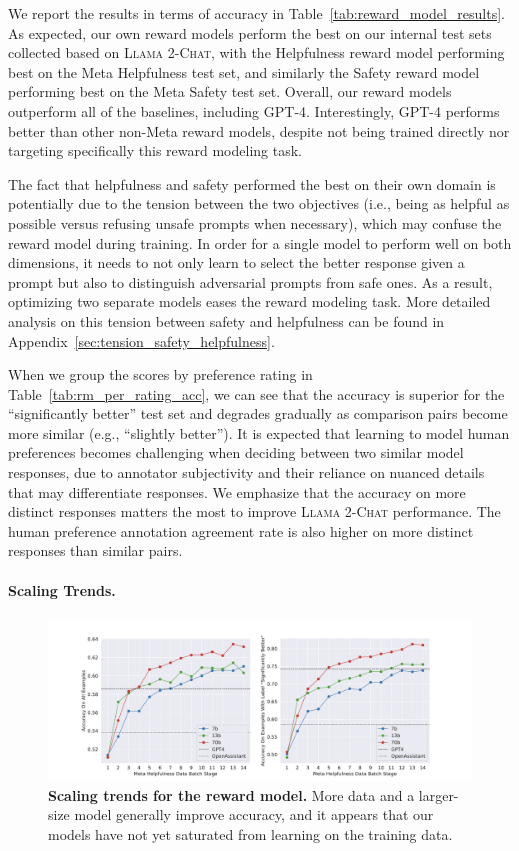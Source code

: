 \documentclass{article}
\newcommand{\modelname}{\textsc{Llama 2-Chat}\xspace}
\begin{document}
We report the results in terms of accuracy in Table~\ref{tab:reward_model_results}. 
As expected, our own reward models perform the best on our internal test sets collected based on \modelname, with the Helpfulness reward model performing best on the Meta Helpfulness test set, and similarly the Safety reward model performing best on the Meta Safety test set. Overall, our reward models outperform all of the baselines, including GPT-4. Interestingly, GPT-4 performs better than other non-Meta reward models, despite not being trained directly nor targeting specifically this reward modeling task. 

The fact that helpfulness and safety performed the best on their own domain is potentially due to the tension between the two objectives (i.e., being as helpful as possible versus refusing unsafe prompts when necessary), which may confuse the reward model during training. 
In order for a single model to perform well on both dimensions, it needs to not only learn to select the better response given a prompt but also to distinguish adversarial prompts from safe ones.
As a result, optimizing two separate models eases the reward modeling task. More detailed analysis on this tension between safety and helpfulness can be found in Appendix~\ref{sec:tension_safety_helpfulness}.

When we group the scores by preference rating in Table~\ref{tab:rm_per_rating_acc}, we can see that the accuracy is superior for the ``significantly better'' test set and degrades gradually as comparison pairs become more similar (e.g., ``slightly better''). 
It is expected that learning to model human preferences becomes challenging when deciding between two similar model responses, due to annotator subjectivity and their reliance on nuanced details that may differentiate responses.
We emphasize that the accuracy on more distinct responses matters the most to improve \modelname{} performance. 
The human preference annotation agreement rate is also higher on more distinct responses than similar pairs. 


\paragraph{Scaling Trends.}

\begin{figure}
    \centering
    \includegraphics[width=1 \linewidth]{img/scaling_laws_reward.pdf}
    \caption{\textbf{Scaling trends for the reward model.} More data and a larger-size model generally improve accuracy, and it appears that our models have not yet saturated from learning on the training data.}
    \label{fig:scaling_laws_reward}
\end{figure}
\end{document}
